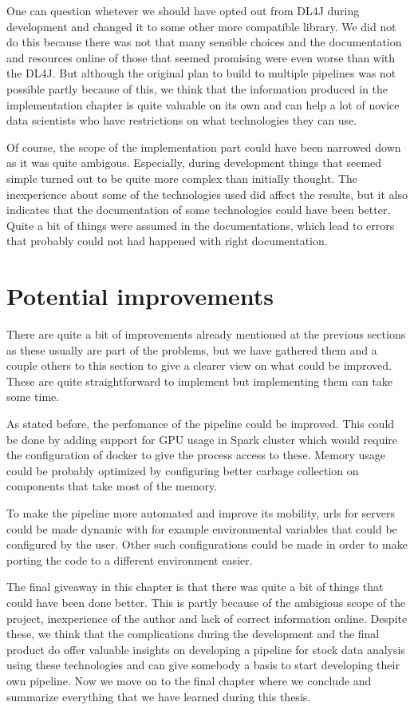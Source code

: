 One can question whetever we should have opted out from DL4J during development and changed it to some other more compatible library.
We did not do this because there was not that many sensible choices and the documentation and resources online of those that seemed promising were even worse than with the DL4J.
But although the original plan to build to multiple pipelines was not possible partly because of this, we think that the information produced in the implementation chapter is quite valuable on its own and can help a lot of novice data scientists who have restrictions on what technologies they can use.

Of course, the scope of the implementation part could have been narrowed down as it was quite ambigous.
Especially, during development things that seemed simple turned out to be quite more complex than initially thought.
The inexperience about some of the technologies used did affect the results, but it also indicates that the documentation of some technologies could have been better.
Quite a bit of things were assumed in the documentations, which lead to errors that probably could not had happened with right documentation.

\section{Potential improvements}

There are quite a bit of improvements already mentioned at the previous sections as these usually are part of the problems, but we have gathered them and a couple others to this section to give a clearer view on what could be improved.
These are quite straightforward to implement but implementing them can take some time.

As stated before, the perfomance of the pipeline could be improved.
This could be done by adding support for GPU usage in Spark cluster which would require the configuration of docker to give the process access to these.
Memory usage could be probably optimized by configuring better carbage collection on components that take most of the memory.

To make the pipeline more automated and improve its mobility, urls for servers could be made dynamic with for example environmental variables that could be configured by the user.
Other such configurations could be made in order to make porting the code to a different environment easier.

The final giveaway in this chapter is that there was quite a bit of things that could have been done better. 
This is partly because of the ambigious scope of the project, inexperience of the author and lack of correct information online.
Despite these, we think that the complications during the development and the final product do offer valuable insights on developing a pipeline for stock data analysis using these technologies and can give somebody a basis to start developing their own pipeline.
Now we move on to the final chapter where we conclude and summarize everything that we have learned during this thesis.